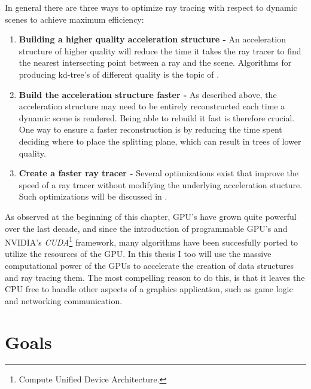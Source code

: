 In general there are three ways to optimize ray tracing with respect to dynamic
scenes to achieve maximum efficiency:

\begin{enumerate}
  \item \textbf{Building a higher quality acceleration structure -} An
    acceleration structure of higher quality will reduce the time it takes the
    ray tracer to find the nearest intersecting point between a ray and the
    scene. Algorithms for producing kd-tree's of different quality is the topic
    of .
  \item \textbf{Build the acceleration structure faster -} As described above,
    the acceleration structure may need to be entirely reconstructed each time a
    dynamic scene is rendered. Being able to rebuild it fast is therefore
    crucial. One way to ensure a faster reconstruction is by reducing the time
    spent deciding where to place the splitting plane, which can result in trees
    of lower quality.
  \item \textbf{Create a faster ray tracer -} Several optimizations exist that
    improve the speed of a ray tracer without modifying the underlying
    acceleration stucture. Such optimizations will be discussed in
    .
\end{enumerate}



As observed at the beginning of this chapter, GPU's have grown quite powerful
over the last decade, and since the introduction of programmable GPU's and
NVIDIA's \textit{CUDA}\footnote{Compute Unified Device Architecture.}
framework, many algorithms have been succesfully ported to utilize the resources
of the GPU. In this thesis I too will use the massive computational power of the
GPUs to accelerate the creation of data structures and ray tracing them. The
most compelling reason to do this, is that it leaves the CPU free to handle
other aspects of a graphics application, such as game logic and networking
communication.




\section{Goals}

